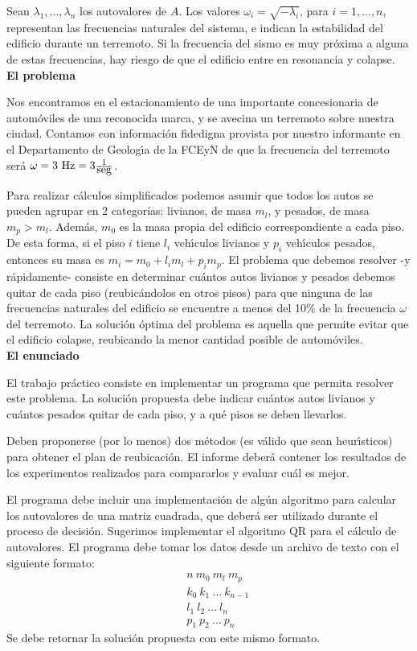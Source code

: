 \documentclass[a4paper]{article}
\begin{document}
Sean $\lambda_1,\dots,\lambda_n$ los autovalores de $A$. Los valores
$\omega_i=\sqrt{-\lambda_i}$, para $i=1,\dots,n$, representan las frecuencias
naturales del sistema, e indican la estabilidad del edificio durante un
terremoto. Si la frecuencia del sismo es muy pr\'oxima a alguna de estas
frecuencias, hay riesgo de que el edificio entre en resonancia y colapse.\\

\textbf{El problema}

Nos encontramos en el 
estacionamiento de una importante concesionaria de autom\' oviles de una reconocida marca,
y se avecina un terremoto sobre nuestra ciudad. 
Contamos con informaci\'on fidedigna provista por nuestro
informante en el Departamento de Geolog\'\i a de la FCEyN 
de que la frecuencia del terremoto ser\'a $\omega = 3\ \hbox{Hz}
= 3 \frac{1}{\hbox{seg}}$.

Para realizar c\'alculos simplificados podemos asumir que todos los autos 
se pueden agrupar en 2 categor\'ias: livianos, de masa $m_l$, y pesados, 
de masa $m_p > m_l$.
Adem\'as, $m_0$ es la masa propia del edificio correspondiente a cada piso.
De esta forma, si el piso $i$ tiene $l_i$ veh\'\i culos livianos y 
$p_i$ veh\'\i culos pesados, entonces su masa es $m_i = m_0 + l_i m_l + p_i m_p$. 
El problema que debemos resolver -y r\'apidamente- consiste en determinar
cu\'antos autos livianos y pesados debemos quitar de cada piso 
(reubic\'andolos en otros pisos) para que ninguna de las frecuencias 
naturales del edificio se encuentre a menos del 10\% de la frecuencia 
$\omega$ del terremoto.
La soluci\'on \'optima del problema es aquella que permite evitar que el
edificio colapse, reubicando la menor cantidad posible de autom\'oviles.\\

\textbf{El enunciado}

El trabajo pr\'actico consiste en implementar un programa que permita 
resolver este problema. La soluci\'on propuesta debe indicar cu\'antos 
autos livianos y cu\'antos pesados quitar de cada piso, y a qu\'e pisos 
se deben llevarlos. 

Deben proponerse (por lo menos) dos m\'etodos (es v\'alido que sean 
heur\'\i sticos) para obtener el plan de reubicaci\'on. El informe 
deber\'a contener los resultados de los experimentos realizados para
compararlos y evaluar cu\'al es mejor. 

El programa debe incluir una implementaci\'on de
alg\'un algoritmo para calcular los autovalores de una matriz cuadrada, que
deber\'a ser utilizado durante el proceso de decisi\'on. Sugerimos implementar
el algoritmo QR para el c\'alculo de autovalores. El programa debe tomar los
datos desde un archivo de texto con el siguiente formato:
\begin{eqnarray}
 & & n\ m_0\ m_l\ m_p \nonumber \\
 & & k_0\ k_1\ \dots\ k_{n-1} \nonumber \\
 & & l_1\ l_2\ \dots\ l_n \nonumber \\
 & & p_1\ p_2\ \dots\ p_n \nonumber
\end{eqnarray}
Se debe retornar la soluci\'on propuesta con este mismo formato.
\end{document}
